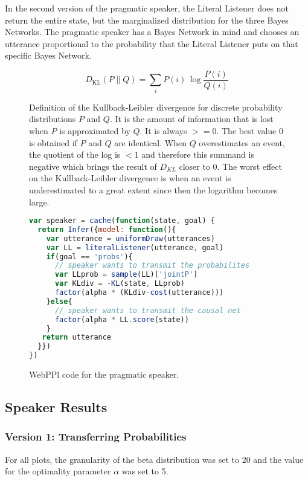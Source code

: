 In the second version of the pragmatic speaker, the Literal Listener does not return the entire state, but the marginalized distribution for the three Bayes Networks. The pragmatic speaker has a Bayes Network in mind and chooses an utterance proportional to the probability that the Literal Listener puts on that specific Bayes Network. 


\begin{figure}[ht]
\begin{equation}
D_{\mathrm {KL} }(P\|Q)= \sum _{i}P(i)\,\log {\frac {P(i)}{Q(i)}}
\end{equation}
\caption{Definition of the Kullback-Leibler divergence for discrete probability distributions $P$ and $Q$. It is the amount of information that is lost when $P$ is approximated by $Q$. It is always $>=0$. The best value 0 is obtained if $P$ and $Q$ are identical. When $Q$ overestimates an event, the quotient of the log is $<1$ and therefore this summand is negative which brings the result of $D_{KL}$ closer to 0. The worst effect on the Kullback-Leibler divergence is when an event is underestimated to a great extent since then the logarithm becomes large.}
\label{eq:KLDiv}
\end{figure}

\begin{figure}[ht]
\begin{minipage}{\linewidth}
\begin{lstlisting}[language=javascript]
var speaker = cache(function(state, goal) {
  return Infer({model: function(){
    var utterance = uniformDraw(utterances)
    var LL = literalListener(utterance, goal)  
    if(goal == 'probs'){
      // speaker wants to transmit the probabilites
      var LLprob = sample(LL)['jointP']
      var KLdiv = -KL(state, LLprob)
      factor(alpha * (KLdiv-cost(utterance)))
    }else{
      // speaker wants to transmit the causal net
      factor(alpha * LL.score(state))
    }
   return utterance
  }})
})
\end{lstlisting}
\caption{WebPPl code for the pragmatic speaker.}
\label{code:speaker}
\end{minipage}
\end{figure}

\FloatBarrier
\subsection*{Speaker Results}
\subsubsection*{Version 1: Transferring Probabilities}
For all plots, the granularity of the beta distribution was set to 20 and the value for the optimality parameter $\alpha$ was set to 5.

